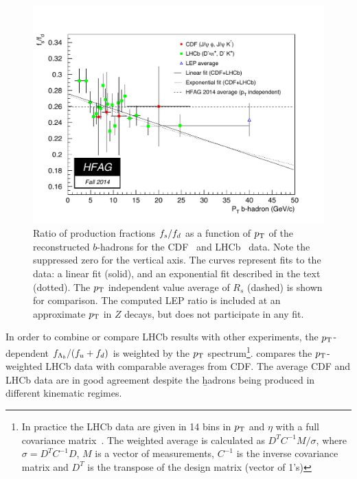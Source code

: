 \begin{figure}
 \begin{center}
  \includegraphics[width=\textwidth]{figures/life_mix/rs_comb}
  \caption{Ratio of production fractions $f_{s}/f_{d}$ as 
   a function of $p_{\rm T}$ of the reconstructed $b$-hadrons for the 
   CDF~\cite{CDFnote10795:2012} and LHCb~\cite{Aaij:2013qqa}
   data. Note the suppressed zero for the vertical axis.
   The curves represent fits to the data:
   a linear fit (solid), and an exponential fit described in the text (dotted).
   The $p_{\rm T}$ independent value average of $R_s$ (dashed) is shown for 
   comparison.
   The computed LEP ratio is included at an 
   approximate $p_{\rm T}$ in $Z$ decays, but does not participate in any fit.}
 \end{center}
\end{figure}

In order to combine or compare LHCb results with other experiments,
the $p_{\rm T}$-dependent $f_{\Lambda_{b}}/(f_{u} + f_{d})$ is weighted by the $p_{\rm T}$ spectrum\footnote{
  \label{foot:life_mix:Aaij:2011jp}
  In practice the LHCb data are given in 14 bins in $p_{\rm T}$ and $\eta$ with a full covariance matrix~\cite{Aaij:2011jp}. 
  The weighted average is calculated as
  $D^T C^{-1} M/\sigma$, where $\sigma = D^T C^{-1} D$, $M$ is a vector 
  of measurements, $C^{-1}$ is the inverse covariance matrix and $D^T$ is the 
  transpose of the design matrix (vector of 1's)}. 
 compares 
the $p_{\rm T}$-weighted LHCb data with comparable averages from CDF. 
The average CDF 
and LHCb data are in good agreement despite the \b hadrons being produced 
in different kinematic regimes.


